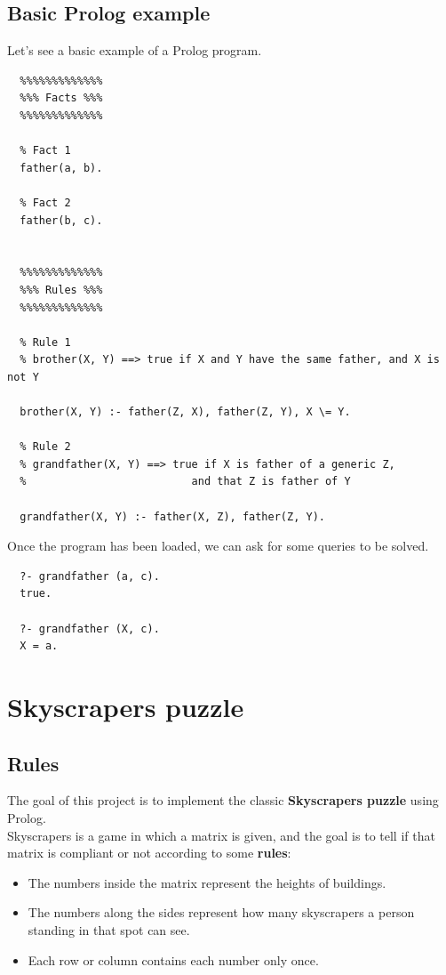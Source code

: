\documentclass{article}
\begin{document}
\pagebreak

\subsection{Basic Prolog example}

Let's see a basic example of a Prolog program.\\

\begin{lstlisting}
  %%%%%%%%%%%%%
  %%% Facts %%%
  %%%%%%%%%%%%%

  % Fact 1
  father(a, b).

  % Fact 2
  father(b, c).
  

  %%%%%%%%%%%%%
  %%% Rules %%%
  %%%%%%%%%%%%%

  % Rule 1
  % brother(X, Y) ==> true if X and Y have the same father, and X is not Y

  brother(X, Y) :- father(Z, X), father(Z, Y), X \= Y. 

  % Rule 2
  % grandfather(X, Y) ==> true if X is father of a generic Z, 
  %                          and that Z is father of Y

  grandfather(X, Y) :- father(X, Z), father(Z, Y).

\end{lstlisting}

\vspace{3mm}

Once the program has been loaded, we can ask for some queries to be solved.\\

\begin{lstlisting}
  ?- grandfather (a, c).
  true.
  
  ?- grandfather (X, c).
  X = a.

\end{lstlisting}

\pagebreak

\section{Skyscrapers puzzle}
\subsection{Rules}
The goal of this project is to implement the classic \textbf{Skyscrapers puzzle} using Prolog.\\

Skyscrapers is a game in which a matrix is given, and the goal is to tell if that matrix is compliant or not according to some \textbf{rules}:\\
\begin{itemize}
  \item The numbers inside the matrix represent the heights of buildings.
  \item The numbers along the sides represent how many skyscrapers a person standing in that spot can see.
  \item Each row or column contains each number only once.
\end{itemize}
\end{document}
